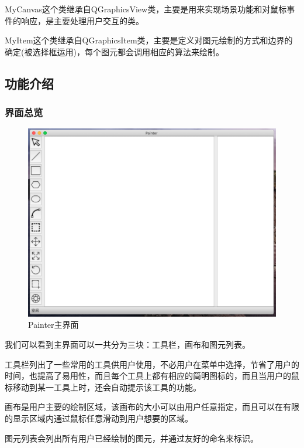 \documentclass[a4paper,UTF8]{article}
\theoremstyle{definition}
\begin{document}
MyCanvas这个类继承自QGraphicsView类，主要是用来实现场景功能和对鼠标事件的响应，是主要处理用户交互的类。

MyItem这个类继承自QGraphicsItem类，主要是定义对图元绘制的方式和边界的确定(被选择框运用)，每个图元都会调用相应的算法来绘制。








\subsection{功能介绍}

\subsubsection{界面总览}

\begin{figure}[H]
    \centering
    \includegraphics[scale=0.5]{Painter.png}
    \caption{Painter主界面}
\end{figure}

我们可以看到主界面可以一共分为三块：工具栏，画布和图元列表。

工具栏列出了一些常用的工具供用户使用，不必用户在菜单中选择，节省了用户的时间，也提高了易用性，而且每个工具上都有相应的简明图标的，而且当用户的鼠标移动到某一工具上时，还会自动提示该工具的功能。

画布是用户主要的绘制区域，该画布的大小可以由用户任意指定，而且可以在有限的显示区域内通过鼠标任意滑动到用户想要的区域。

图元列表会列出所有用户已经绘制的图元，并通过友好的命名来标识。
\end{document}
